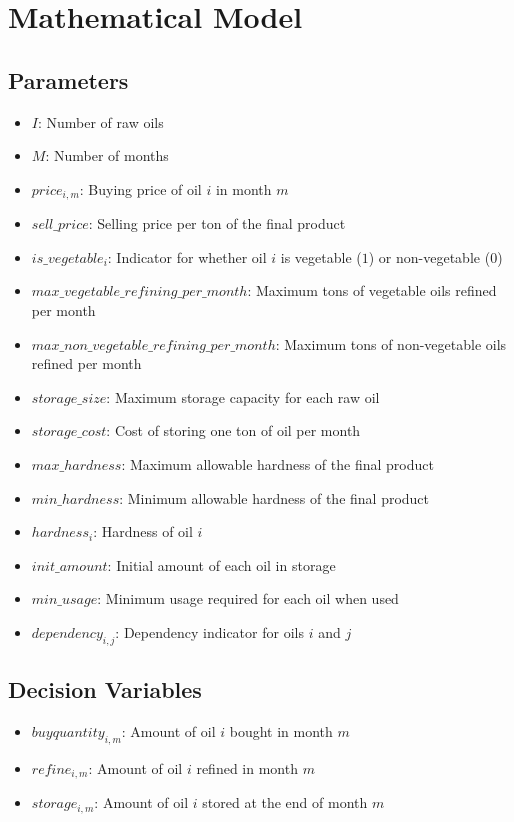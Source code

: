 \documentclass{article}
\begin{document}
\section*{Mathematical Model}

\subsection*{Parameters}
\begin{itemize}
    \item $I$: Number of raw oils
    \item $M$: Number of months
    \item $price_{i,m}$: Buying price of oil $i$ in month $m$
    \item $sell\_price$: Selling price per ton of the final product
    \item $is\_vegetable_{i}$: Indicator for whether oil $i$ is vegetable ($1$) or non-vegetable ($0$)
    \item $max\_vegetable\_refining\_per\_month$: Maximum tons of vegetable oils refined per month
    \item $max\_non\_vegetable\_refining\_per\_month$: Maximum tons of non-vegetable oils refined per month
    \item $storage\_size$: Maximum storage capacity for each raw oil
    \item $storage\_cost$: Cost of storing one ton of oil per month
    \item $max\_hardness$: Maximum allowable hardness of the final product
    \item $min\_hardness$: Minimum allowable hardness of the final product
    \item $hardness_{i}$: Hardness of oil $i$
    \item $init\_amount$: Initial amount of each oil in storage
    \item $min\_usage$: Minimum usage required for each oil when used
    \item $dependency_{i,j}$: Dependency indicator for oils $i$ and $j$
\end{itemize}

\subsection*{Decision Variables}
\begin{itemize}
    \item $buyquantity_{i,m}$: Amount of oil $i$ bought in month $m$
    \item $refine_{i,m}$: Amount of oil $i$ refined in month $m$
    \item $storage_{i,m}$: Amount of oil $i$ stored at the end of month $m$
\end{itemize}
\end{document}
